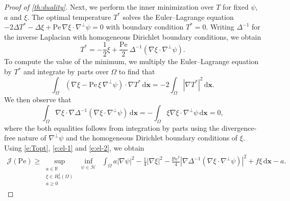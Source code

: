 \documentclass[a4paper, 10pt]{amsart}
\numberwithin{equation}{section}
\theoremstyle{plain}
\theoremstyle{definition}
\theoremstyle{remark}
\newcommand{\cal}[1]{\mathcal{#1}}
\newcommand{\R}{\mathbb{R}}
\newcommand{\Pe}{\mathrm{Pe}}
\renewcommand{\vec}[1]{\mathbf{#1}}
\newcommand{\abs}[1]{\left\vert #1 \right\vert}
\newcommand{\dx}{\mathrm{d} \vec{x}}
\newcommand{\invlap}{\Delta^{-1}}
\newcommand{\avg}[1]{\int_\Omega #1 \,\dx}
\newcommand{\ocpval}{\mathcal{J}}
\begin{document}
\begin{proof}[Proof of \cref{th:duality}]
    Next, we perform the inner minimization over $T$ for fixed $\psi$, $a$ and $\xi$. The optimal temperature $T^*$ solves the Euler--Lagrange equation
    $-2\Delta T^* - \Delta \xi + \Pe \, \nabla \xi \cdot \nabla^\perp \psi = 0$
    with boundary condition $T^* = 0$. Writing $\invlap$ for the inverse Laplacian with homogeneous Dirichlet boundary conditions, we obtain
    \begin{equation}\label{e:Topt}
        T^* = - \frac12\xi + \frac{\Pe}{2}\ \invlap(\nabla \xi \cdot \nabla^\perp \psi).
    \end{equation}
    To compute the value of the minimum, we multiply the Euler--Lagrange equation by $T^*$ and integrate by parts over $\Omega$ to find that
    \begin{equation}\label{e:el-1}
    \avg{ (\nabla\xi - \Pe\,\xi\,\nabla^\perp\psi )\cdot \nabla T^*} = -2 \avg{\abs{\nabla T^*}^2}.
    \end{equation}
    We then observe that
    \begin{equation}\label{e:el-2}
        \avg{\nabla \xi \cdot \nabla \invlap(\nabla \xi \cdot \nabla^\perp \psi)}
        = -\avg{ \xi \nabla \xi \cdot \nabla^\perp \psi}
        = 0,
    \end{equation}
    where the both equalities follows from integration by parts using the divergence-free nature of $\nabla^\perp \psi$ and the homogeneous Dirichlet boundary conditions of $\xi$. Using \cref{e:Topt}, \cref{e:el-1} and \cref{e:el-2}, we obtain
    \begin{align*}
        \ocpval(\Pe)
        \geq 
        \sup_{\substack{a \in \R \\ \xi \in H^1_0(\Omega) \\ a\geq 0}}
        \inf_{\substack{ %
        \psi \in \cal{H}
        }}\; %
        \avg{
            a |\nabla \psi|^2 
            - \frac14 \abs{\nabla \xi}^2 
            - \frac{\Pe^2}{4} \abs{\nabla \invlap(\nabla \xi \cdot \nabla^\perp \psi)}^2 
            + f\xi
        } 
        - a.
    \end{align*}


\end{proof}
\end{document}
